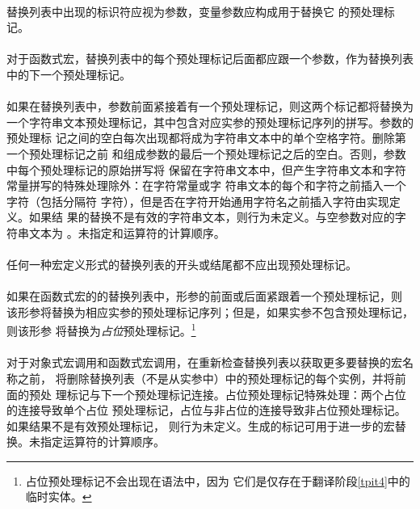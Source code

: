 {\paragraph{}
替换列表中出现的标识符应视为参数，变量参数应构成用于替换它
的预处理标记。

\constraint
\paragraph{}
对于函数式宏，替换列表中的每个预处理标记\tm{\#}后面都应跟一个参数，作为替换列表
中的下一个预处理标记。

\semantic
\paragraph{}
如果在替换列表中，参数前面紧接着有一个\tm{\#}预处理标记，则这两个标记都将替换为
一个字符串文本预处理标记，其中包含对应实参的预处理标记序列的拼写。参数的预处理标
记之间的空白每次出现都将成为字符串文本中的单个空格字符。删除第一个预处理标记之前
和组成参数的最后一个预处理标记之后的空白。否则，参数中每个预处理标记的原始拼写将
保留在字符串文本中，但产生字符串文本和字符常量拼写的特殊处理除外：在字符常量或字
符串文本的每个\tm{\dq}和\tm{\bs}字符之前插入一个\tm{\bs}字符（包括分隔符\tm{\dq}
字符），但是否在\tm{\bs}字符开始通用字符名之前插入\tm{\bs}字符由实现定义。如果结
果的替换不是有效的字符串文本，则行为未定义。与空参数对应的字符串文本为
\tm{\dq\dq}。未指定\tm{\#}和\tm{\#\#}运算符的计算顺序。

\constraint
\paragraph{}
任何一种宏定义形式的替换列表的开头或结尾都不应出现\tm{\#\#}预处理标记。

\semantic
\paragraph{}
如果在函数式宏的的替换列表中，形参的前面或后面紧跟着一个\tm{\#\#}预处理标记，则
该形参将替换为相应实参的预处理标记序列；但是，如果实参不包含预处理标记，则该形参
将替换为\textit{占位}预处理标记。\footnote{占位预处理标记不会出现在语法中，因为
它们是仅存在于翻译阶段\ref{tpit4}中的临时实体。}

\paragraph{}
对于对象式宏调用和函数式宏调用，在重新检查替换列表以获取更多要替换的宏名称之前，
将删除替换列表（不是从实参中）中的\tm{\#\#}预处理标记的每个实例，并将前面的预处
理标记与下一个预处理标记连接。占位预处理标记特殊处理：两个占位的连接导致单个占位
预处理标记，占位与非占位的连接导致非占位预处理标记。如果结果不是有效预处理标记，
则行为未定义。生成的标记可用于进一步的宏替换。未指定运算符的计算顺序。

}
